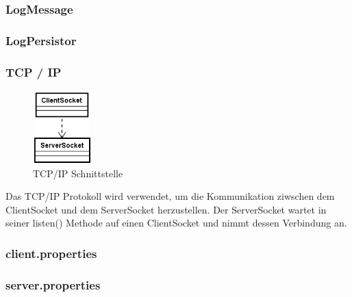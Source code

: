\subsubsection{LogMessage}
\subsubsection{LogPersistor}
\subsubsection{TCP / IP}
\begin{figure}[H]
	\centering
	\includegraphics[width=0.2\textwidth]{3_Schnittstellen/Bilder/tcpip.png}
	\caption{TCP/IP Schnittstelle}
	\label{fig:TCP/IP Klassendiagramm}
\end{figure}
Das TCP/IP Protokoll wird verwendet, um die Kommunikation ziwschen dem ClientSocket und dem ServerSocket herzustellen. Der ServerSocket wartet in seiner listen() Methode auf einen ClientSocket und nimmt dessen Verbindung an.
\subsubsection{client.properties}
\subsubsection{server.properties}